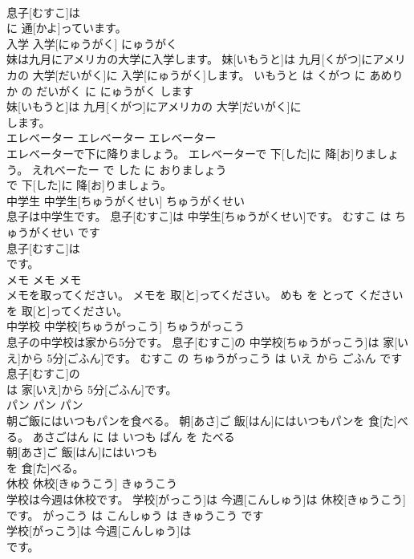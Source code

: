 \documentclass[8pt]{extreport}
\begin{document}
\begin{CJK}{UTF8}{min}
\\	息子[むすこ]は
\\	に 通[かよ]っています。			
\\	入学	入学[にゅうがく]	にゅうがく	
\\	妹は九月にアメリカの大学に入学します。	妹[いもうと]は 九月[くがつ]にアメリカの 大学[だいがく]に 入学[にゅうがく]します。	いもうと は くがつ に あめりか の だいがく に にゅうがく します	
\\	妹[いもうと]は 九月[くがつ]にアメリカの 大学[だいがく]に
\\	します。			
\\	エレベーター	エレベーター	エレベーター	
\\	エレベーターで下に降りましょう。	エレベーターで 下[した]に 降[お]りましょう。	えれべーたー で した に おりましょう	
\\	で 下[した]に 降[お]りましょう。			
\\	中学生	中学生[ちゅうがくせい]	ちゅうがくせい	
\\	息子は中学生です。	息子[むすこ]は 中学生[ちゅうがくせい]です。	むすこ は ちゅうがくせい です	
\\	息子[むすこ]は
\\	です。			
\\	メモ	メモ	メモ	
\\	メモを取ってください。	メモを 取[と]ってください。	めも を とって ください	
\\	を 取[と]ってください。			
\\	中学校	中学校[ちゅうがっこう]	ちゅうがっこう	
\\	息子の中学校は家から5分です。	息子[むすこ]の 中学校[ちゅうがっこう]は 家[いえ]から 5分[ごふん]です。	むすこ の ちゅうがっこう は いえ から ごふん です	
\\	息子[むすこ]の
\\	は 家[いえ]から 5分[ごふん]です。			
\\	パン	パン	パン	
\\	朝ご飯にはいつもパンを食べる。	朝[あさ]ご 飯[はん]にはいつもパンを 食[た]べる。	あさごはん に は いつも ぱん を たべる	
\\	朝[あさ]ご 飯[はん]にはいつも
\\	を 食[た]べる。			
\\	休校	休校[きゅうこう]	きゅうこう	
\\	学校は今週は休校です。	学校[がっこう]は 今週[こんしゅう]は 休校[きゅうこう]です。	がっこう は こんしゅう は きゅうこう です	
\\	学校[がっこう]は 今週[こんしゅう]は
\\	です。			

\end{CJK}
\end{document}
